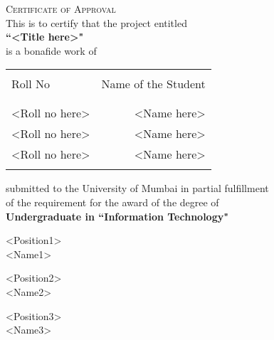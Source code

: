 \newpage

\begin{center}
    \Large \textsc {Certificate of Approval}\\[0.5cm]
    \normalsize This is to certify that the project entitled\\[0.5cm]
    \large \textbf {``<Title here>"}\\[0.5cm]
    \normalsize is a bonafide work of
\end{center}

\begin{table}[h]
    \centering
    \begin{tabular}{lr}\hline                           \\
        Roll No        & Name of the Student \\
        \\ \hline
        \\
        <Roll no here> & <Name here>         \\
        <Roll no here> & <Name here>         \\
        <Roll no here> & <Name here>         \\
        \\ \hline
    \end{tabular}
\end{table}

\begin{center}
    submitted to the University of Mumbai in partial fulfillment\\
    of the requirement for the award of the degree of\\[0.5cm]
    \large \textbf {Undergraduate in ``Information Technology"}\\[1.5cm]
\end{center}

\begin{center}
    \begin{minipage}[b]{0.33333\textwidth}
        \raggedright
        <Position1>\\
        <Name1>
    \end{minipage}%
    \begin{minipage}[b]{0.33333\textwidth}
        \centering
        <Position2>\\
        <Name2>
    \end{minipage}%
    \begin{minipage}[b]{0.33333\textwidth}
        \raggedleft
        <Position3>\\
        <Name3>
    \end{minipage}
\end{center}